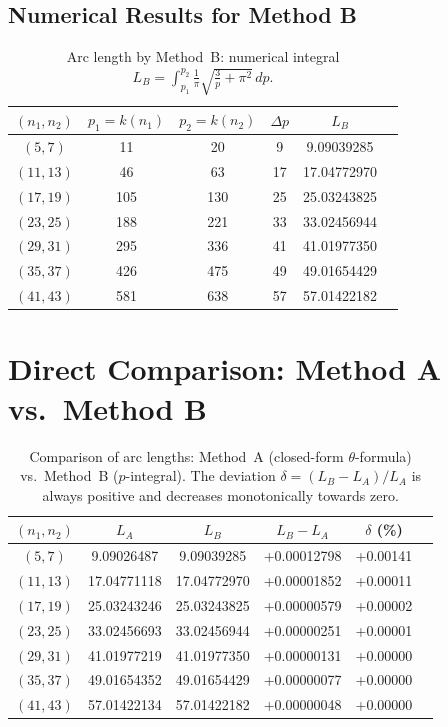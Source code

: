 \subsection{Numerical Results for Method B}

\begin{table}[H]
\centering
\caption{Arc length by Method~B: numerical integral
  $L_B = \int_{p_1}^{p_2} \frac{1}{\pi}\sqrt{\frac{3}{p}+\pi^2}\,dp$.}
\renewcommand{\arraystretch}{1.2}
\begin{tabular}{cccccc}
\toprule
$(n_1, n_2)$ & $p_1 = k(n_1)$ & $p_2 = k(n_2)$ & $\Delta p$ & $L_B$ \\
\midrule
$( 5,  7)$ &  11 &  20 &  9 &  9.09039285 \\
$(11, 13)$ &  46 &  63 & 17 & 17.04772970 \\
$(17, 19)$ & 105 & 130 & 25 & 25.03243825 \\
$(23, 25)$ & 188 & 221 & 33 & 33.02456944 \\
$(29, 31)$ & 295 & 336 & 41 & 41.01977350 \\
$(35, 37)$ & 426 & 475 & 49 & 49.01654429 \\
$(41, 43)$ & 581 & 638 & 57 & 57.01422182 \\
\bottomrule
\end{tabular}
\end{table}


\section{Direct Comparison: Method A vs.\ Method B}
\label{sec:methoden_vergleich}

\begin{table}[H]
\centering
\caption{Comparison of arc lengths: Method~A (closed-form $\theta$-formula)
  vs.\ Method~B ($p$-integral). The deviation $\delta = (L_B - L_A)/L_A$
  is always positive and decreases monotonically towards zero.}
\renewcommand{\arraystretch}{1.25}
\begin{tabular}{cccccc}
\toprule
$(n_1, n_2)$ & $L_A$ & $L_B$ & $L_B - L_A$ & $\delta$ (\%) \\
\midrule
$( 5,  7)$ &  9.09026487 &  9.09039285 & +0.00012798 & +0.00141 \\
$(11, 13)$ & 17.04771118 & 17.04772970 & +0.00001852 & +0.00011 \\
$(17, 19)$ & 25.03243246 & 25.03243825 & +0.00000579 & +0.00002 \\
$(23, 25)$ & 33.02456693 & 33.02456944 & +0.00000251 & +0.00001 \\
$(29, 31)$ & 41.01977219 & 41.01977350 & +0.00000131 & +0.00000 \\
$(35, 37)$ & 49.01654352 & 49.01654429 & +0.00000077 & +0.00000 \\
$(41, 43)$ & 57.01422134 & 57.01422182 & +0.00000048 & +0.00000 \\
\bottomrule
\end{tabular}
\end{table}

